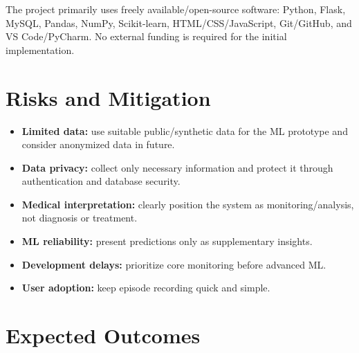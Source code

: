 \documentclass[11pt,a4paper]{article}
\begin{document}
The project primarily uses freely available/open-source software: Python, Flask, MySQL, Pandas, NumPy, Scikit-learn, HTML/CSS/JavaScript, Git/GitHub, and VS Code/PyCharm. No external funding is required for the initial implementation.

\section{Risks and Mitigation}

\begin{itemize}
\item \textbf{Limited data:} use suitable public/synthetic data for the ML prototype and consider anonymized data in future.
\item \textbf{Data privacy:} collect only necessary information and protect it through authentication and database security.
\item \textbf{Medical interpretation:} clearly position the system as monitoring/analysis, not diagnosis or treatment.
\item \textbf{ML reliability:} present predictions only as supplementary insights.
\item \textbf{Development delays:} prioritize core monitoring before advanced ML.
\item \textbf{User adoption:} keep episode recording quick and simple.
\end{itemize}

\begin{center}
\end{center}

\section{Expected Outcomes}
\end{document}
